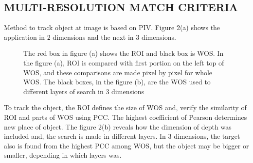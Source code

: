 
\subsection{MULTI-RESOLUTION MATCH CRITERIA}
Method to track object at image is based on PIV. Figure 2(a) shows the application in 2 dimensions and the next in
3 dimensions.

\begin{figure}[H]
\centering
  \caption{The red box in figure (a) shows the ROI and black box is WOS. In the figure (a), 
  ROI is compared with first portion on the left top of WOS, and these comparisons are made 
  pixel by pixel for whole WOS. The black boxes, in the figure (b), are the WOS used 
  to different layers of search in 3 dimensions}
\end{figure}

To track the object, the ROI defines the size of WOS and, verify the similarity of ROI and parts of WOS using PCC. 
The highest coefficient of Pearson determines new place of object. The figure 2(b) reveals how the dimension of depth was included and, 
the search is made in different layers. In 3 dimensions, the target also is found from the highest PCC among WOS, but the object may be 
bigger or smaller, depending in which layers was.\\
